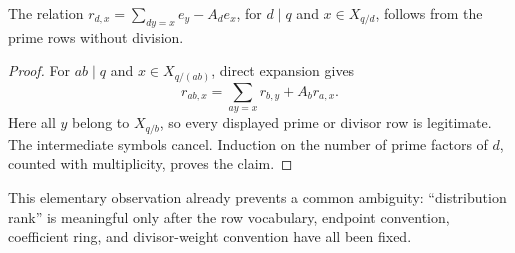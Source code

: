 \begin{lemma}\label{ir:lem:divisor}
The relation $r_{d,x}=\sum_{dy=x}e_y-A_de_x$, for $d\mid q$ and
$x\in X_{q/d}$, follows from the prime rows without division.
\end{lemma}
\begin{proof}
For $ab\mid q$ and $x\in X_{q/(ab)}$, direct expansion gives
\[
 r_{ab,x}=\sum_{ay=x}r_{b,y}+A_b r_{a,x}.
\]
Here all $y$ belong to $X_{q/b}$, so every displayed prime or divisor
row is legitimate. The intermediate symbols cancel. Induction on the
number of prime factors of $d$, counted with multiplicity, proves the
claim.
\end{proof}

This elementary observation already prevents a common ambiguity:
``distribution rank'' is meaningful only after the row vocabulary,
endpoint convention, coefficient ring, and divisor-weight convention
have all been fixed.







